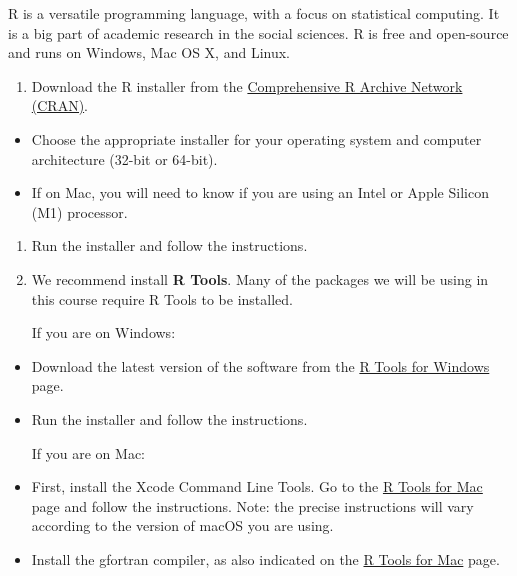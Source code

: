 \documentclass[
  letterpaper,
  DIV=11,
  numbers=noendperiod]{scrartcl}
\providecommand{\tightlist}{%
  \setlength{\itemsep}{0pt}\setlength{\parskip}{0pt}}\usepackage{longtable,booktabs,array}
\begin{document}
\begin{tcolorbox}[enhanced jigsaw, leftrule=.75mm, toprule=.15mm, breakable, titlerule=0mm, opacitybacktitle=0.6, colframe=quarto-callout-tip-color-frame, arc=.35mm, bottomtitle=1mm, toptitle=1mm, title=\textcolor{quarto-callout-tip-color}{\faLightbulb}\hspace{0.5em}{R install details}, rightrule=.15mm, colback=white, bottomrule=.15mm, opacityback=0, left=2mm, colbacktitle=quarto-callout-tip-color!10!white, coltitle=black]

R is a versatile programming language, with a focus on statistical
computing. It is a big part of academic research in the social sciences.
R is free and open-source and runs on Windows, Mac OS X, and Linux.

\begin{enumerate}
\def\labelenumi{\arabic{enumi}.}
\tightlist
\item
  Download the R installer from the
  \href{https://cran.r-project.org/}{Comprehensive R Archive Network
  (CRAN)}.
\end{enumerate}

\begin{itemize}
\tightlist
\item
  Choose the appropriate installer for your operating system and
  computer architecture (32-bit or 64-bit).
\item
  If on Mac, you will need to know if you are using an Intel or Apple
  Silicon (M1) processor.
\end{itemize}

\begin{enumerate}
\def\labelenumi{\arabic{enumi}.}
\setcounter{enumi}{1}
\item
  Run the installer and follow the instructions.
\item
  We recommend install \textbf{R Tools}. Many of the packages we will be
  using in this course require R Tools to be installed.

  If you are on Windows:
\end{enumerate}

\begin{itemize}
\item
  Download the latest version of the software from the
  \href{https://cran.r-project.org/bin/windows/Rtools/}{R Tools for
  Windows} page.
\item
  Run the installer and follow the instructions.

  If you are on Mac:
\item
  First, install the Xcode Command Line Tools. Go to the
  \href{https://mac.r-project.org/tools/}{R Tools for Mac} page and
  follow the instructions. Note: the precise instructions will vary
  according to the version of macOS you are using.
\item
  Install the gfortran compiler, as also indicated on the
  \href{https://mac.r-project.org/tools/}{R Tools for Mac} page.
\end{itemize}

\end{tcolorbox}
\end{document}
